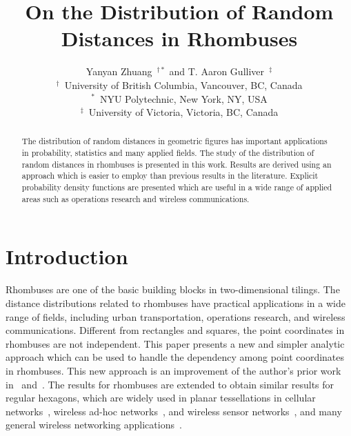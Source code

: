 \documentclass[12pt,draftclsnofoot,onecolumn]{IEEEtran}
\begin{document}
\title{On the Distribution of Random\\Distances in Rhombuses}

\author{Yanyan Zhuang~$^{\dagger *}$ and T. Aaron Gulliver~$^\ddagger$\\
$^\dagger$~University of British Columbia, Vancouver, BC, Canada\\
$^*$~NYU Polytechnic, New York, NY, USA\\
$^\ddagger$~University of Victoria, Victoria, BC, Canada}

\maketitle
\thispagestyle{empty}

\begin{abstract}
The distribution of random distances in geometric figures has important
applications in probability, statistics and many applied fields.
The study of the distribution of random distances in rhombuses is presented
in this work. Results are derived using an approach which is easier to
employ than previous results in the literature. Explicit
probability density functions are presented which are useful in a wide range of applied
areas such as operations research and wireless communications.
\end{abstract}

\section{Introduction}
Rhombuses are one of the basic building blocks in two-dimensional tilings. The
distance distributions related to rhombuses have practical applications in a
wide range of fields, including urban transportation, operations research, and wireless communications.
Different from rectangles and squares, the point coordinates in rhombuses are
not independent. This paper presents a new and simpler analytic approach which can be used
to handle the dependency among point coordinates in rhombuses. This new approach
is an improvement of the author's prior work in~\cite{zhuang2011random}
and~\cite{zhuang2012geometrical}. The results for rhombuses are extended
to obtain similar results for regular hexagons, which
are widely used in planar tessellations in cellular
networks~\cite{zhuang2011geometric}, wireless ad-hoc
networks~\cite{zhuang2013planar}, and wireless sensor
networks~\cite{schwiebert2001research, chang2008hexagonal, wang2009analytical},
and many general wireless networking applications~\cite{baltzis2012distance}.
\end{document}
